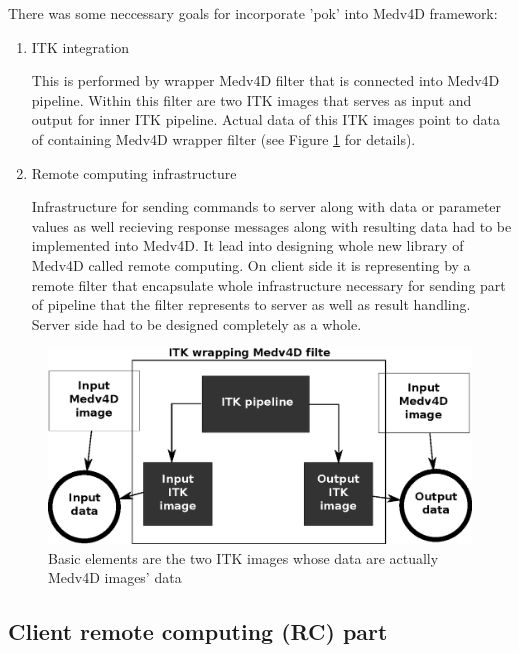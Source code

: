 \par
There was some neccessary goals for incorporate 'pok' into Medv4D framework:
\begin{enumerate}
  \item{ITK integration}
  \par
  This is performed by wrapper Medv4D filter that is connected into Medv4D pipeline. Within this filter are two ITK images that serves as input and output for inner ITK pipeline. Actual data of this ITK images point to data of containing Medv4D wrapper filter (see Figure \ref{fg:ITKWrapping} for details).

  \item{Remote computing infrastructure}
  \par
  Infrastructure for sending commands to server along with data or parameter values as well recieving response messages along with resulting data had to be implemented into Medv4D. It lead into designing whole new library of Medv4D called remote computing. On client side it is representing by a remote filter that encapsulate whole infrastructure necessary for sending part of pipeline that the filter represents to server as well as result handling. Server side had to be designed completely as a whole.
\end{enumerate}

\begin{figure}
    \centering
    \includegraphics[width=12cm]{data/ITKFilter.eps}
    \caption[ITK wrapper Medv4D filter]{Basic elements are the two ITK images whose data are actually Medv4D images' data}
    \label{fg:ITKWrapping}
\end{figure}

\subsection{Client remote computing (RC) part}


